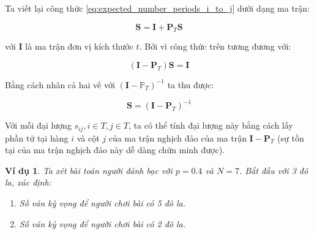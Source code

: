\documentclass[14pt, a4paper]{article}
\numberwithin{equation}{section}
\numberwithin{figure}{section}
\theoremstyle{sltheorem}
\newtheorem{vd}{Ví dụ}
\theoremstyle{soltheorem}
\numberwithin{dl}{section}
\numberwithin{md}{section}
\numberwithin{vd}{section}
\begin{document}
    Ta viết lại công thức \ref{eq:expected_number_periods_i_to_j} dưới dạng ma trận:

    \begin{equation*}
        \mathbf{S} = \mathbf{I} + \mathbf{P}_T \mathbf{S}
    \end{equation*}

    với $\mathbf{I}$ là ma trận đơn vị kích thước $t$. Bởi vì công thức trên tương đương với:

    \begin{equation*}
        (\mathbf{I} - \mathbf{P}_T) \mathbf{S} = \mathbf{I}
    \end{equation*}

    Bằng cách nhân cả hai vế với $(\mathbf{I} - \mathbb{P}_T)^{-1}$ ta thu được:

    \begin{equation*}
        \mathbf{S} = (\mathbf{I} - \mathbf{P}_T)^{-1}
    \end{equation*}

    Với mỗi đại lượng $s_{ij}, i \in T, j \in T$, ta có thể tính đại lượng này bằng cách lấy phần tử tại hàng $i$ và cột $j$ của ma trận nghịch đảo của ma trận $\mathbf{I} - \mathbf{P}_T$ (sự tồn tại của ma trận nghịch đảo này dễ dàng chứn minh được).

    \begin{vd} \label{vd:gambler-ruin-problem}
        Ta xét bài toán người đánh bạc với $p=0.4$ và $N=7$. Bắt đầu với 3 đô la, xác định:
        \begin{enumerate}[label=(\alph*)]
            \item Số ván kỳ vọng để người chơi bài có 5 đô la.
            \item Số ván kỳ vọng để người chơi bài có 2 đô la.
        \end{enumerate}
    \end{vd}
\end{document}
